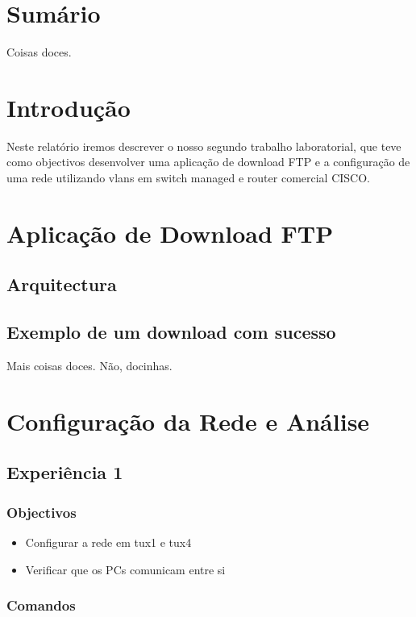 \documentclass[a4paper,11pt]{article}
\begin{document}
\newpage
\section{Sumário}
Coisas doces.

\section{Introdução}
Neste relatório iremos descrever o nosso segundo trabalho laboratorial, que teve como objectivos desenvolver uma aplicação de download FTP e a configuração de uma rede utilizando vlans em switch managed e router comercial CISCO.

\section{Aplicação de Download FTP}
\subsection{Arquitectura}

\subsection{Exemplo de um download com sucesso}
Mais coisas doces. Não, docinhas.

\section{Configuração da Rede e Análise }
\subsection{Experiência 1}
\subsubsection{Objectivos}
\begin{itemize}
\item Configurar a rede em tux1 e tux4
\item Verificar que os PCs comunicam entre si
\end{itemize}

\subsubsection{Comandos}
\end{document}
